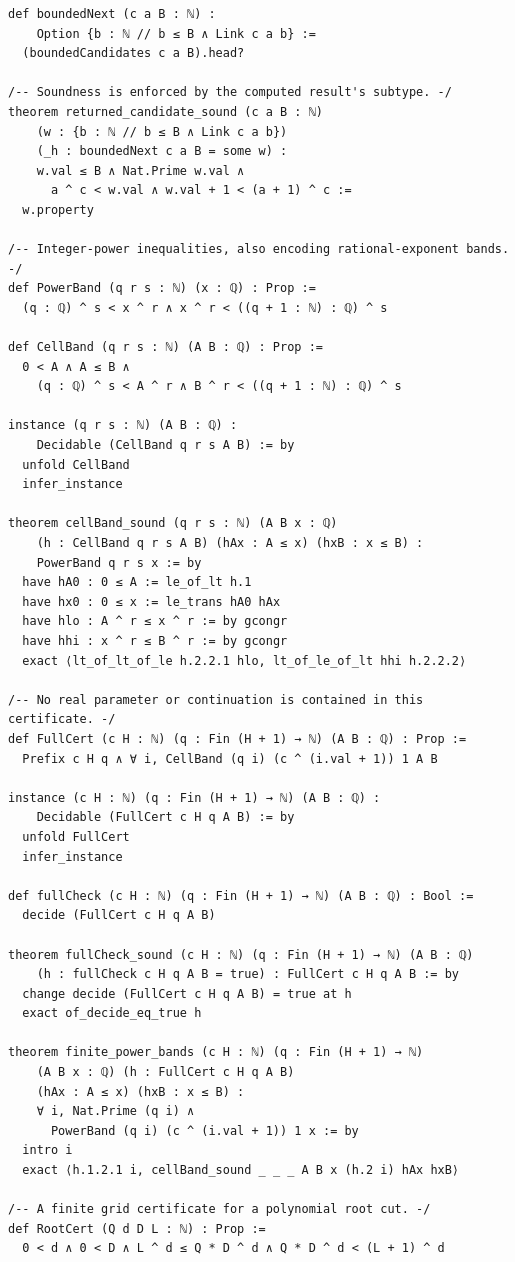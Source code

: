 \documentclass[11pt,reqno]{amsart}
\theoremstyle{blueplain}
\newcounter{type}
\numberwithin{equation}{section}
\begin{document}
\begin{lstlisting}[style=lean,basicstyle=\ttfamily\scriptsize,numberstyle=\scriptsize]
def boundedNext (c a B : ℕ) :
    Option {b : ℕ // b ≤ B ∧ Link c a b} :=
  (boundedCandidates c a B).head?

/-- Soundness is enforced by the computed result's subtype. -/
theorem returned_candidate_sound (c a B : ℕ)
    (w : {b : ℕ // b ≤ B ∧ Link c a b})
    (_h : boundedNext c a B = some w) :
    w.val ≤ B ∧ Nat.Prime w.val ∧
      a ^ c < w.val ∧ w.val + 1 < (a + 1) ^ c :=
  w.property

/-- Integer-power inequalities, also encoding rational-exponent bands. -/
def PowerBand (q r s : ℕ) (x : ℚ) : Prop :=
  (q : ℚ) ^ s < x ^ r ∧ x ^ r < ((q + 1 : ℕ) : ℚ) ^ s

def CellBand (q r s : ℕ) (A B : ℚ) : Prop :=
  0 < A ∧ A ≤ B ∧
    (q : ℚ) ^ s < A ^ r ∧ B ^ r < ((q + 1 : ℕ) : ℚ) ^ s

instance (q r s : ℕ) (A B : ℚ) :
    Decidable (CellBand q r s A B) := by
  unfold CellBand
  infer_instance

theorem cellBand_sound (q r s : ℕ) (A B x : ℚ)
    (h : CellBand q r s A B) (hAx : A ≤ x) (hxB : x ≤ B) :
    PowerBand q r s x := by
  have hA0 : 0 ≤ A := le_of_lt h.1
  have hx0 : 0 ≤ x := le_trans hA0 hAx
  have hlo : A ^ r ≤ x ^ r := by gcongr
  have hhi : x ^ r ≤ B ^ r := by gcongr
  exact ⟨lt_of_lt_of_le h.2.2.1 hlo, lt_of_le_of_lt hhi h.2.2.2⟩

/-- No real parameter or continuation is contained in this certificate. -/
def FullCert (c H : ℕ) (q : Fin (H + 1) → ℕ) (A B : ℚ) : Prop :=
  Prefix c H q ∧ ∀ i, CellBand (q i) (c ^ (i.val + 1)) 1 A B

instance (c H : ℕ) (q : Fin (H + 1) → ℕ) (A B : ℚ) :
    Decidable (FullCert c H q A B) := by
  unfold FullCert
  infer_instance

def fullCheck (c H : ℕ) (q : Fin (H + 1) → ℕ) (A B : ℚ) : Bool :=
  decide (FullCert c H q A B)

theorem fullCheck_sound (c H : ℕ) (q : Fin (H + 1) → ℕ) (A B : ℚ)
    (h : fullCheck c H q A B = true) : FullCert c H q A B := by
  change decide (FullCert c H q A B) = true at h
  exact of_decide_eq_true h

theorem finite_power_bands (c H : ℕ) (q : Fin (H + 1) → ℕ)
    (A B x : ℚ) (h : FullCert c H q A B)
    (hAx : A ≤ x) (hxB : x ≤ B) :
    ∀ i, Nat.Prime (q i) ∧
      PowerBand (q i) (c ^ (i.val + 1)) 1 x := by
  intro i
  exact ⟨h.1.2.1 i, cellBand_sound _ _ _ A B x (h.2 i) hAx hxB⟩

/-- A finite grid certificate for a polynomial root cut. -/
def RootCert (Q d D L : ℕ) : Prop :=
  0 < d ∧ 0 < D ∧ L ^ d ≤ Q * D ^ d ∧ Q * D ^ d < (L + 1) ^ d


\end{lstlisting}
\end{document}
